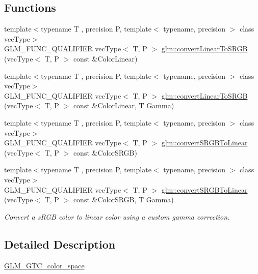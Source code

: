 \subsection*{Functions}
\begin{DoxyCompactItemize}
\item 
{\footnotesize template$<$typename T , precision P, template$<$ typename, precision $>$ class vec\+Type$>$ }\\G\+L\+M\+\_\+\+F\+U\+N\+C\+\_\+\+Q\+U\+A\+L\+I\+F\+I\+ER vec\+Type$<$ T, P $>$ \hyperlink{group__gtc__color__space_gad813dcd99644cafc775e83d6504ccb93}{glm\+::convert\+Linear\+To\+S\+R\+GB} (vec\+Type$<$ T, P $>$ const \&Color\+Linear)
\item 
{\footnotesize template$<$typename T , precision P, template$<$ typename, precision $>$ class vec\+Type$>$ }\\G\+L\+M\+\_\+\+F\+U\+N\+C\+\_\+\+Q\+U\+A\+L\+I\+F\+I\+ER vec\+Type$<$ T, P $>$ \hyperlink{group__gtc__color__space_ga63f8b003da7acf44370eb47bfb8b3d42}{glm\+::convert\+Linear\+To\+S\+R\+GB} (vec\+Type$<$ T, P $>$ const \&Color\+Linear, T Gamma)
\item 
{\footnotesize template$<$typename T , precision P, template$<$ typename, precision $>$ class vec\+Type$>$ }\\G\+L\+M\+\_\+\+F\+U\+N\+C\+\_\+\+Q\+U\+A\+L\+I\+F\+I\+ER vec\+Type$<$ T, P $>$ \hyperlink{group__gtc__color__space_ga28e98e64347cf385cadc1ceb4def55c9}{glm\+::convert\+S\+R\+G\+B\+To\+Linear} (vec\+Type$<$ T, P $>$ const \&Color\+S\+R\+GB)
\item 
{\footnotesize template$<$typename T , precision P, template$<$ typename, precision $>$ class vec\+Type$>$ }\\G\+L\+M\+\_\+\+F\+U\+N\+C\+\_\+\+Q\+U\+A\+L\+I\+F\+I\+ER vec\+Type$<$ T, P $>$ \hyperlink{group__gtc__color__space_ga61c4f0efdf55c29d9cfbd26141fddef8}{glm\+::convert\+S\+R\+G\+B\+To\+Linear} (vec\+Type$<$ T, P $>$ const \&Color\+S\+R\+GB, T Gamma)
\begin{DoxyCompactList}\small\item\em Convert a s\+R\+GB color to linear color using a custom gamma correction. \end{DoxyCompactList}\end{DoxyCompactItemize}


\subsection{Detailed Description}
\hyperlink{group__gtc__color__space}{G\+L\+M\+\_\+\+G\+T\+C\+\_\+color\+\_\+space} 